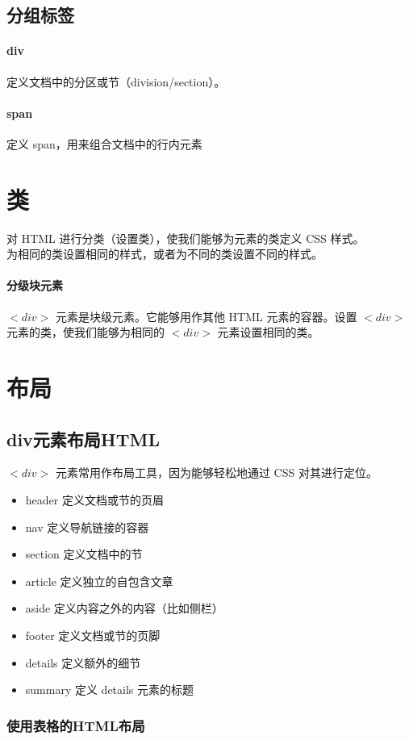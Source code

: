 \documentclass[10pt,UTF8]{ctexart}
\begin{document}
\subsection{分组标签}
\paragraph{div}定义文档中的分区或节（division/section）。
\paragraph{span}定义 span，用来组合文档中的行内元素

\section{类}
\noindent 对 HTML 进行分类（设置类），使我们能够为元素的类定义 CSS 样式。\\
为相同的类设置相同的样式，或者为不同的类设置不同的样式。
\paragraph{分级块元素}$<div>$ 元素是块级元素。它能够用作其他 HTML 元素的容器。设置 $<div>$ 元素的类，使我们能够为相同的 $<div>$ 元素设置相同的类。

\section{布局}
\subsection{div元素布局HTML}
$<div>$ 元素常用作布局工具，因为能够轻松地通过 CSS 对其进行定位。
\begin{itemize}
\item header 定义文档或节的页眉
\item nav 定义导航链接的容器
\item section 定义文档中的节
\item article 定义独立的自包含文章
\item aside	定义内容之外的内容（比如侧栏）
\item footer 定义文档或节的页脚
\item details 定义额外的细节
\item summary 定义 details 元素的标题
\end{itemize}

\subsubsection{使用表格的HTML布局}
\end{document}
